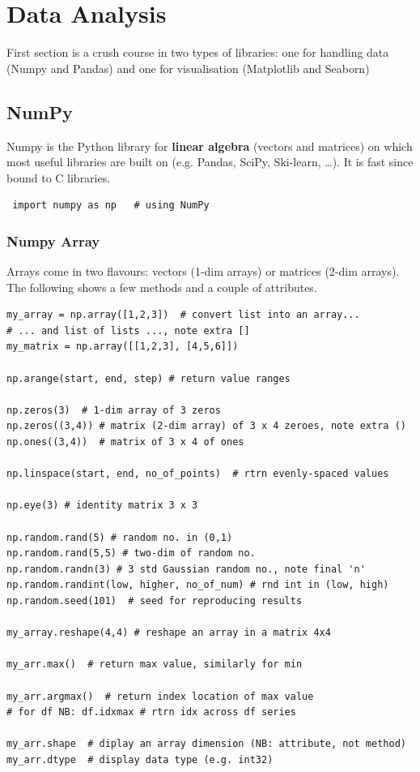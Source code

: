 \documentclass[12pt]{article}
\begin{document}
\section{Data Analysis} \label{sec:Data}
First section is a crush course in two types of libraries: one for handling data (Numpy and Pandas) and one for visualisation (Matplotlib and Seaborn)

\subsection{NumPy}
Numpy is the Python library for \textbf{linear algebra} (vectors and matrices) on which most useful libraries are built on (e.g. Pandas, SciPy,  Ski-learn, \ldots). It is fast since bound to C libraries.

\begin{lstlisting}
 import numpy as np   # using NumPy  
\end{lstlisting}

\subsubsection{Numpy Array}
Arrays come in two flavours: vectors (1-dim arrays) or matrices (2-dim arrays). The following shows a few methods and a couple of attributes.

\begin{lstlisting}
my_array = np.array([1,2,3])  # convert list into an array... 
# ... and list of lists ..., note extra []
my_matrix = np.array([[1,2,3], [4,5,6]])  

np.arange(start, end, step) # return value ranges 

np.zeros(3)  # 1-dim array of 3 zeros
np.zeros((3,4)) # matrix (2-dim array) of 3 x 4 zeroes, note extra ()
np.ones((3,4))  # matrix of 3 x 4 of ones

np.linspace(start, end, no_of_points)  # rtrn evenly-spaced values

np.eye(3) # identity matrix 3 x 3

np.random.rand(5) # random no. in (0,1) 
np.random.rand(5,5) # two-dim of random no.
np.random.randn(3) # 3 std Gaussian random no., note final 'n'
np.random.randint(low, higher, no_of_num) # rnd int in (low, high)
np.random.seed(101)  # seed for reproducing results

my_array.reshape(4,4) # reshape an array in a matrix 4x4

my_arr.max()  # return max value, similarly for min

my_arr.argmax()  # return index location of max value
# for df NB: df.idxmax # rtrn idx across df series

my_arr.shape  # diplay an array dimension (NB: attribute, not method)
my_arr.dtype  # display data type (e.g. int32)
\end{lstlisting}
\end{document}
